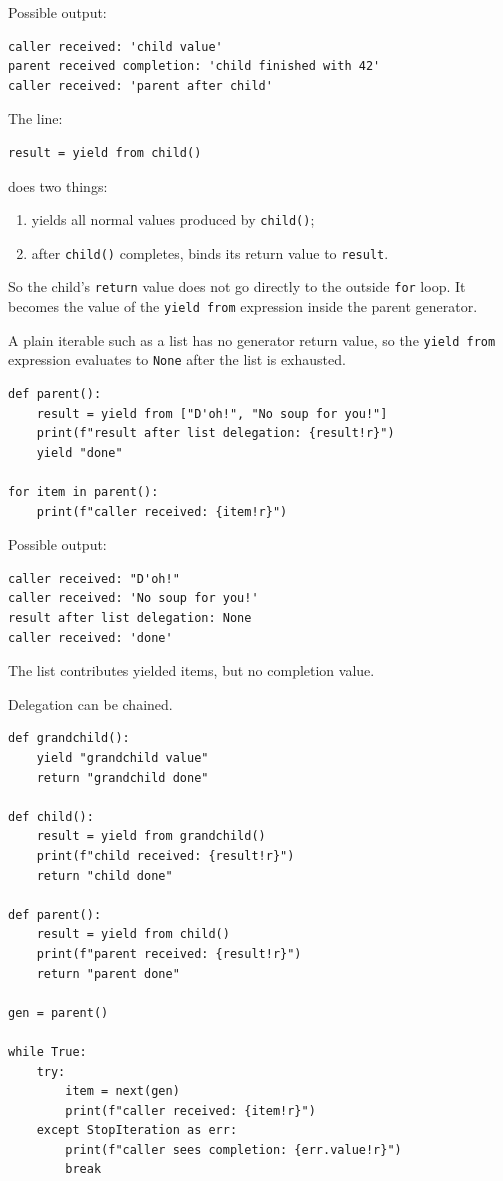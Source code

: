 Possible output:

\begin{verbatim}
caller received: 'child value'
parent received completion: 'child finished with 42'
caller received: 'parent after child'
\end{verbatim}

The line:

\begin{verbatim}
result = yield from child()
\end{verbatim}

does two things:

\begin{enumerate}
    \item yields all normal values produced by \texttt{child()};
    \item after \texttt{child()} completes, binds its return value to \texttt{result}.
\end{enumerate}

So the child's \texttt{return} value does not go directly to the outside \texttt{for} loop. It becomes the value of the \texttt{yield from} expression inside the parent generator.

A plain iterable such as a list has no generator return value, so the \texttt{yield from} expression evaluates to \texttt{None} after the list is exhausted.

\begin{verbatim}
def parent():
    result = yield from ["D'oh!", "No soup for you!"]
    print(f"result after list delegation: {result!r}")
    yield "done"

for item in parent():
    print(f"caller received: {item!r}")
\end{verbatim}

Possible output:

\begin{verbatim}
caller received: "D'oh!"
caller received: 'No soup for you!'
result after list delegation: None
caller received: 'done'
\end{verbatim}

The list contributes yielded items, but no completion value.

Delegation can be chained.

\begin{verbatim}
def grandchild():
    yield "grandchild value"
    return "grandchild done"

def child():
    result = yield from grandchild()
    print(f"child received: {result!r}")
    return "child done"

def parent():
    result = yield from child()
    print(f"parent received: {result!r}")
    return "parent done"

gen = parent()

while True:
    try:
        item = next(gen)
        print(f"caller received: {item!r}")
    except StopIteration as err:
        print(f"caller sees completion: {err.value!r}")
        break
\end{verbatim}


